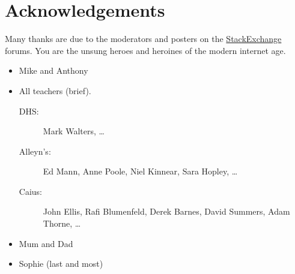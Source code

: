 \chapter*{Acknowledgements}


Many thanks are due to the moderators and posters on the \mbox{\href{http://stackexchange.com/}{StackExchange}} forums. You are the unsung heroes and heroines of the modern internet age.

\begin{itemize}
  \item Mike and Anthony
  \item All teachers (brief). 
    \begin{description}
      \item[DHS:] Mark Walters, \ldots
      \item[Alleyn's:] Ed Mann, Anne Poole, Niel Kinnear, Sara Hopley, \ldots 
      \item[Caius:] John Ellis, Rafi Blumenfeld, Derek Barnes, David Summers, Adam Thorne, \ldots
    \end{description}
  \item Mum and Dad
  \item Sophie (last and most)
\end{itemize}

\cleardoublepage{}
